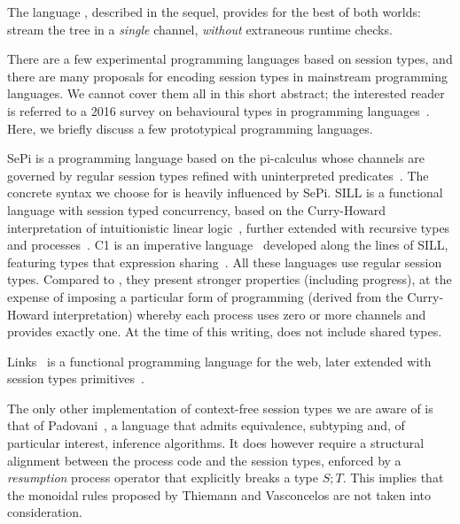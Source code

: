 The language \freest, described in the sequel, provides for the best
of both worlds: stream the tree in a \emph{single} channel,
\emph{without} extraneous runtime checks.


There are a few experimental programming languages based on session
types, and there are many proposals for encoding session types in
mainstream programming languages. We cannot cover them all in
this short abstract; the interested reader is referred to a 2016
survey on behavioural types in programming
languages~\cite{DBLP:journals/ftpl/AnconaBB0CDGGGH16}.  Here, we briefly
discuss a few prototypical programming languages.

SePi is a programming language based on the pi-calculus whose channels
are governed by regular session types refined with uninterpreted
predicates~\cite{DBLP:conf/sefm/FrancoV13}. The concrete syntax we
choose for \freest{} is heavily influenced by SePi.
%
SILL is a functional language with session typed concurrency, based on
the Curry-Howard interpretation of intuitionistic linear
logic~\cite{DBLP:conf/concur/CairesP10}, further extended with
recursive types and
processes~\cite{Toninho:phd,DBLP:conf/esop/ToninhoCP13}.
%
C1 is an imperative language~\cite{Pfenning:C1} developed along the
lines of SILL, featuring types that expression
sharing~\cite{DBLP:journals/pacmpl/BalzerP17}.
%
All these languages use regular session types. Compared to \freest,
they present stronger properties (including progress), at the expense
of imposing a particular form of programming (derived from the
Curry-Howard interpretation) whereby each process uses zero or more
channels and provides exactly one. At the time of this writing,
\freest{} does not include shared types.

Links~\cite{DBLP:conf/fmco/CooperLWY06} is a functional programming
language for the web, later extended with session types
primitives~\cite{Lindley.Morris_Lightweight.functional.session.types}.

The only other implementation of context-free session types we are
aware of is that of Padovani~\cite{DBLP:conf/esop/Padovani17}, a
language that admits equivalence, subtyping and, of particular
interest, inference algorithms. It does however require a structural
alignment between the process code and the session types, enforced by
a \emph{resumption} process operator that explicitly breaks a type
$S;T$. This implies that the monoidal rules proposed by Thiemann and
Vasconcelos are not taken into consideration.

